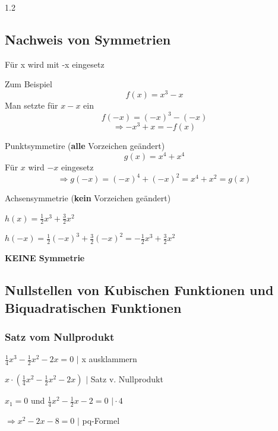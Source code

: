 \documentclass{article}
\newcommand{\Zeilenabstand}{1.2}
\begin{document}
\begin{spacing}{\Zeilenabstand}
    \subsection{Nachweis von Symmetrien}

    Für x wird mit -x eingesetz

    Zum Beispiel
    \begin{equation}
        f(x) = x^3 -x
    \end{equation}
    Man setzte für $x -x$ ein
    \begin{equation}
        f(-x) = (-x)^{3} -(-x) 
    \end{equation}
    \begin{equation}
        \Rightarrow -x^{3} + x = -f(x)
    \end{equation}

    Punktsymmetire (\textbf{alle} Vorzeichen geändert)
    \begin{equation}
        g(x) = x^4 + x^{4}
    \end{equation}
    Für $x$ wird $-x$ eingesetz
    \begin{equation}
        \Rightarrow g(-x) = (-x)^{4} + (-x)^{2} = x^{4} + x^{2} = g(x) 
    \end{equation}

    Achsensymmetrie (\textbf{kein} Vorzeichen geändert)
    \vspace{5mm}

    $ h(x) =\frac{1}{2} x^3 + \frac{3}{2}x^2$

    $ h(-x) = \frac{1}{2} (-x)^3 + \frac{3}{2} (-x)^2 = -\frac{1}{2}x^3 + \frac{3}{2}x^2$

    \textbf{KEINE Symmetrie}

    \subsection{Nullstellen von Kubischen Funktionen und Biquadratischen Funktionen}
    \subsubsection{Satz vom Nullprodukt}
    $ \frac{1}{4}x^3 -\frac{1}{2}x^2-2x=0$ $\vert$ x ausklammern

    $x \cdot (\frac{1}{4}x^2-\frac{1}{2}x^2-2x) $ $\vert$ Satz v. Nullprodukt

    $x_1 = 0$ und $\frac{1}{4}x^2-\frac{1}{2}x-2=0$ $\vert \cdot 4$

    $\Rightarrow x^2 - 2x - 8 = 0 $ $\vert$ pq-Formel


\end{spacing}
\end{document}
